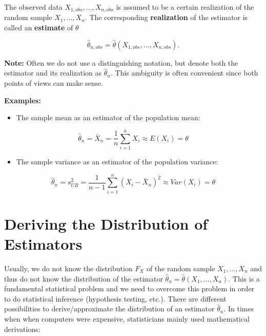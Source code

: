\documentclass[
  letterpaper,
  DIV=11,
  numbers=noendperiod]{scrreprt}
\providecommand{\tightlist}{%
  \setlength{\itemsep}{0pt}\setlength{\parskip}{0pt}}\usepackage{longtable,booktabs,array}
\theoremstyle{definition}
\theoremstyle{plain}
\theoremstyle{plain}
\theoremstyle{remark}
\begin{document}
The observed data \(X_{1,obs},\dots,X_{n,obs}\) is assumed to be a
certain realization of the random sample \(X_1,\dots,X_n\). The
corresponding \textbf{realization} of the estimator is called an
\textbf{estimate} of \(\theta\)

\[
\hat\theta_{n,obs}=\hat\theta(X_{1,obs},\dots,X_{n,obs}).
\]

\textbf{Note:} Often we do not use a distinguishing notation, but denote
both the estimator and its realization as \(\hat\theta_{n}\). This
ambiguity is often convenient since both points of views can make sense.

\textbf{Examples:}

\begin{itemize}
\tightlist
\item
  The sample mean as an estimator of the population mean:
\end{itemize}

\[
\hat\theta_n=\bar{X}_n=\frac{1}{n}\sum_{i=1}^nX_i \approx E(X_i) =\theta
\]

\begin{itemize}
\tightlist
\item
  The sample variance as an estimator of the population variance:
\end{itemize}

\[
\hat\theta_n=s_{UB}^2=\frac{1}{n-1}\sum_{i=1}^n\left(X_i - \bar{X}_n\right)^2 \approx Var(X_i) =\theta
\]

\hypertarget{deriving-the-distribution-of-estimators}{%
\section{Deriving the Distribution of
Estimators}\label{deriving-the-distribution-of-estimators}}

Usually, we do not know the distribution \(F_X\) of the random sample
\(X_1,\dots,X_n\) and thus do not know the distribution of the estimator
\(\hat\theta_n=\hat\theta(X_1,\dots,X_n)\). This is a fundamental
statistical problem and we need to overcome this problem in order to do
statistical inference (hypothesis testing, etc.). There are different
possibilities to derive/approximate the distribution of an estimator
\(\hat\theta_n\). In times when when computers were expensive,
statisticians mainly used mathematical derivations:
\end{document}
